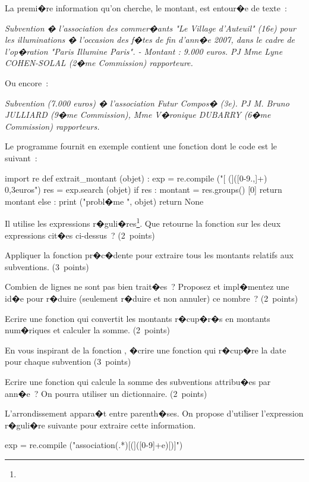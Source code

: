 \begin{xexercice}
\exequest La premi�re information qu'on cherche, le montant, est entour�e de texte~:

\textit{Subvention � l'association des commer�ants "Le Village d'Auteuil" (16e) pour les illuminations � l'occasion des f�tes de fin d'ann�e 2007, dans le cadre de l'op�ration "Paris Illumine Paris". - Montant : 9.000 euros.	PJ	Mme Lyne COHEN-SOLAL (2�me Commission) rapporteure.}

Ou encore~:

\textit{Subvention (7.000 euros) � l'association Futur Compos� (3e).	PJ	M. Bruno JULLIARD (9�me Commission), Mme V�ronique DUBARRY (6�me Commission) rapporteurs.}

Le programme fournit en exemple contient une fonction dont le code est le suivant~:


\begin{verbatimx}
import re
def extrait_montant (objet) :
    exp = re.compile ("[ (]([0-9.,]+) {0,3}euros")
    res = exp.search (objet)
    if res :
        montant = res.groups() [0]
        return montant
    else :
        print ("probl�me ", objet)
        return None
\end{verbatimx}

Il utilise les expressions r�guli�res\footnote{}. Que retourne la fonction sur les deux expressions cit�es ci-dessus~? (2~points)



\exequest Appliquer la fonction pr�c�dente pour extraire tous les montants relatifs aux subventions. (3~points)

\exequest Combien de lignes ne sont pas bien trait�es~? Proposez et impl�mentez une id�e pour r�duire (seulement r�duire et non annuler) ce nombre~? (2~points)

\exequest Ecrire une fonction qui convertit les montants r�cup�r�s en montants num�riques et calculer la somme. (2~points)

\exequest En vous inspirant de la fonction , �crire une fonction qui r�cup�re la date pour chaque subvention (3~points)

\exequest Ecrire une fonction qui calcule la somme des subventions attribu�es par ann�e~? On pourra utiliser un dictionnaire. (2~points)

\exequest L'arrondissement appara�t entre parenth�ses. On propose d'utiliser l'expression r�guli�re suivante pour extraire cette information.

\begin{verbatimx}
exp = re.compile ("association(.*)[(]([0-9]+e)[)]")
\end{verbatimx}


\end{xexercice}
